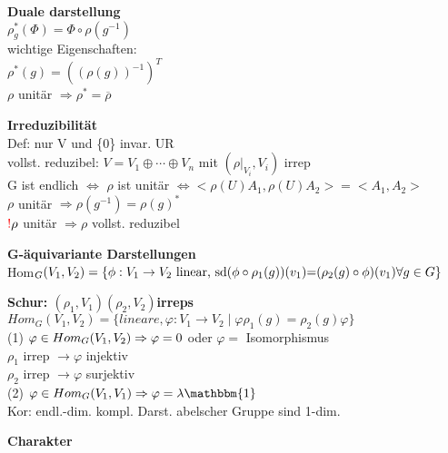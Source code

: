 \documentclass[8pt, a4paper, landscape]{extarticle}
\newcommand{\tit}[1]{\textbf{#1} \\}
\newcommand{\sh}[1]{\small\textbf{#1}}
\newcommand{\eq}{\negthickspace=\negthickspace}
\newcommand{\hi}[1]{\textcolor{Cerulean}{#1}}
\newcommand{\re}[1]{\textcolor{red}{#1}}
\begin{document}
\begin{multicols*}{5}
\begin{ibox}
    \tit{Duale darstellung}
    $\rho^*_g(\Phi)=\Phi\circ\rho(g^{-1})$\\
    wichtige Eigenschaften:\\
    \textbullet $\rho^*(g)=((\rho(g))^{-1})^T$\\
    \textbullet $\rho$ unitär $\Rightarrow \rho^*=\overline{\rho}$
\end{ibox}


\begin{ibox}
    \tit{Irreduzibilität}
    Def: nur V und \{0\} invar. UR\\
    \hi{vollst. reduzibel}: $V = V_1 \oplus \cdots\oplus V_n$ mit $(\rho|_{V_i},V_i)$ irrep\\
    \textbullet G ist endlich $\Leftrightarrow$ $\rho$ ist \hi{unitär} $\Leftrightarrow <\rho(U)A_1,\rho(U)A_2>=<A_1,A_2>$\\
    \textbullet $\rho$ unitär $\Rightarrow \rho(g^{-1})=\rho(g)^*$\\
    $\re{!} \rho$ unitär $\Rightarrow\rho$ vollst. reduzibel
\end{ibox}
\begin{ibox}
\tit{G-äquivariante Darstellungen}
Hom$_G(V_1,V_2)=\{\phi:V_1\rightarrow V_2 \text{ linear, sd}\\ (\phi\circ\rho_1(g))(v_1)\eq(\rho_2(g)\circ\phi)(v_1)\forall g\in G\}$
\end{ibox}
\begin{ibox}
    \tit{Schur: $(\rho_1,V_1) (\rho_2,V_2) $irreps}
    $Hom_G(V_1,V_2) =\{lineare, \varphi: V_1 \rightarrow V_2 \mid \varphi  \rho_1(g)=\rho_2(g)\varphi\}$ \\
    (1) $\varphi\in Hom_G(V_1,V_2)\\ \Rightarrow \varphi = 0$ oder $ \varphi =$ Isomorphismus\\
    $\rho_1$ irrep $\rightarrow \varphi$ injektiv\\
    $\rho_2$ irrep $\rightarrow \varphi$ surjektiv\\
    (2) $\varphi\in Hom_G(V_1,V_1) \Rightarrow \varphi = \lambda \mathbbm{1}$
    \\
    \hi{Kor:} endl.-dim. kompl. Darst. abelscher Gruppe sind 1-dim.
\end{ibox}   







\begin{cbox}
    \sh{Charakter}
\end{cbox}


\end{multicols*}
\end{document}
